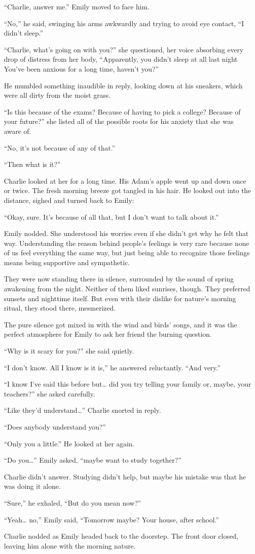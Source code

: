 “Charlie, answer me.” Emily moved to face him.

“No,” he said, swinging his arms awkwardly and trying to avoid eye contact, “I didn't sleep.”

“Charlie, what's going on with you?” she questioned, her voice absorbing every drop of distress from her body, “Apparently, you didn't sleep at all last night You've been anxious for a long time, haven't you?”

He mumbled something inaudible in reply, looking down at his sneakers, which were all dirty from the moist grass.

“Is this because of the exams? Because of having to pick a college? Because of your future?” she listed all of the possible roots for his anxiety that she was aware of.

“No, it's not because of any of that.”

“Then what is it?”

Charlie looked at her for a long time. His Adam's apple went up and down once or twice. The fresh morning breeze got tangled in his hair. He looked out into the distance, sighed and turned back to Emily:

“Okay, sure. It's because of all that, but I don't want to talk about it.”

Emily nodded. She understood his worries even if she didn't get why he felt that way. Understanding the reason behind people's feelings is very rare because none of us feel everything the same way, but just being able to recognize those feelings means being supportive and sympathetic.

They were now standing there in silence, surrounded by the sound of spring awakening from the night. Neither of them liked sunrises, though. They preferred sunsets and nighttime itself. But even with their dislike for nature's morning ritual, they stood there, mesmerized.

The pure silence got mixed in with the wind and birds' songs, and it was the perfect atmosphere for Emily to ask her friend the burning question.

“Why is it scary for you?” she said quietly.

“I don't know. All I know is it is,” he answered reluctantly. “And very.”

“I know I've said this before but… did you try telling your family or, maybe, your teachers?” she asked carefully.

“Like they'd understand…” Charlie snorted in reply.

“Does anybody understand you?”

“Only you a little.” He looked at her again.

“Do you…” Emily asked, “maybe want to study together?”

Charlie didn't answer. Studying didn't help, but maybe his mistake was that he was doing it alone.

“Sure,” he exhaled, “But do you mean now?”

“Yeah… no,” Emily said, “Tomorrow maybe? Your house, after school.”

Charlie nodded as Emily headed back to the doorstep. The front door closed, leaving him alone with the morning nature.
